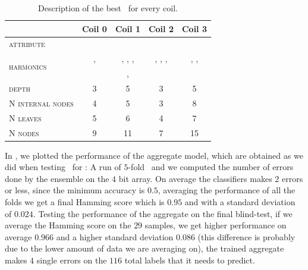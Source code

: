 \begin{table}[!ht]
	\caption{Description of the best \dt\ for every coil.}\label{tbl:tree-description}

	\bigskip
	\setlength{\tabcolsep}{6pt}
	\centering
	\begin{tabular}{lcccc}
		\toprule
		\textbf{}                           & \textbf{Coil 0}  & \textbf{Coil 1}          & \textbf{Coil 2}          & \textbf{Coil 3}
		\\
		\midrule
		\textsc{attribute}                  & \an              & \bn                      & \an                      & \cnmod                          \\
		\multirow{2}{*}{\textsc{harmonics}} & \an[2], \an[3]   & \bn[3], \bn[4], \bn[10], & \an[1], \an[2], \an[12], & \cnmod[1], \cnmod[6], \cnmod[7] \\
		                                    &
		                                    & \bn[11], \bn[13] & \an[15]                  &                                                            \\
		\textsc{depth}                      & 3                & 5
		                                    & 3                & 5                                                                                     \\
		\textsc{N internal nodes}           & 4                & 5
		                                    & 3                & 8                                                                                     \\
		\textsc{N leaves}                   & 5                & 6
		                                    & 4                & 7                                                                                     \\
		\textsc{N nodes}                    & 9                & 11
		                                    & 7                & 15                                                                                    \\
		\bottomrule
	\end{tabular}
\end{table}

In , we plotted the performance of the aggregate model, which are obtained as we
did when testing \tas\ for \qrp: A run of $5$-fold \cv\ and we computed the number of errors done by
the ensemble on the $4$ bit array. On average the classifiers makes $2$ errors or less, since the
minimum accuracy is $0.5$, averaging the performance of all the folds we get a final Hamming score
which is $0.95$ and with a standard deviation of $0.024$. Testing the performance of the aggregate
on the final blind-test, if we average the Hamming score on the $29$ samples, we get higher
performance on average $0.966$ and a higher standard deviation $0.086$ (this difference is probably
due to the lower amount of data we are averaging on), the trained aggregate makes $4$ single errors
on the $116$ total labels that it needs to predict.

